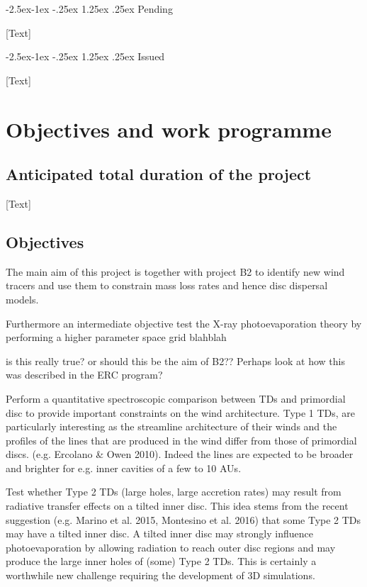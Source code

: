 \documentclass[10pt,fleqn,twoside]{article}
\makeatletter
\newcommand{\Tcol}{\color{blue}}
\renewcommand\paragraph{\@startsection{paragraph}{4}{\z@}%
            {-2.5ex\@plus -1ex \@minus -.25ex}%
            {1.25ex \@plus .25ex}%
            {\normalfont\normalsize\bfseries}}
\makeatother
\begin{document}
\paragraph{\Tcol Pending}

[Text]

\paragraph{\Tcol Issued}

[Text]

\section{\Tcol Objectives and work programme}
\renewcommand{\leftmark}{\sc Objectives and work programme}


\subsection{\Tcol Anticipated total duration of the project}

[Text]

\subsection{\Tcol Objectives}


The main aim of this project is together with project B2 to identify
new wind tracers and use them to constrain mass loss rates and hence
disc dispersal models.

{\color{red} Furthermore an intermediate objective test the X-ray 
photoevaporation theory by performing a higher parameter space grid blahblah}

{\color{red} is this really true? or should this be the aim of B2??
  Perhaps look at how this was described in the ERC program?}

Perform a quantitative spectroscopic comparison between TDs and
primordial disc to provide important constraints on the wind architecture. 
Type 1 TDs, are particularly interesting as the streamline architecture of their winds
and the profiles of the lines that are produced in the wind
differ from those of primordial discs. (e.g. Ercolano \& Owen
2010). Indeed the lines are expected to be broader and brighter for
e.g. inner cavities of a few to 10 AUs. 

Test whether Type 2 TDs (large holes, large accretion rates) may
result from radiative transfer effects on a tilted inner disc. This
idea stems from  the recent suggestion (e.g. Marino et al. 2015, Montesino et
al. 2016) that some Type 2 TDs may have a tilted inner disc. 
A tilted inner disc may strongly influence photoevaporation by
allowing radiation to reach outer disc regions and may produce the
large inner holes of (some) Type 2 TDs. This is certainly a worthwhile
new challenge requiring the development of 3D simulations.  
\end{document}
